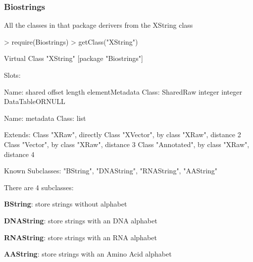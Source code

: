 \documentclass{beamer}
\begin{document}
\begin{frame}[fragile]
\frametitle{Biostrings}
  \bit
      \item \small{All the classes in that package derivers from the XString class}
        \begin{uncoverenv}
\begin{Schunk}
\begin{Sinput}
> require(Biostrings)
> getClass("XString")
\end{Sinput}
\begin{Soutput}
Virtual Class "XString" [package "Biostrings"]

Slots:
                                                                      
Name:           shared          offset          length elementMetadata
Class:       SharedRaw         integer         integer DataTableORNULL
                      
Name:         metadata
Class:            list

Extends: 
Class "XRaw", directly
Class "XVector", by class "XRaw", distance 2
Class "Vector", by class "XRaw", distance 3
Class "Annotated", by class "XRaw", distance 4

Known Subclasses: "BString", "DNAString", "RNAString", "AAString"
\end{Soutput}
\end{Schunk}
        \end{uncoverenv}
      \item There are 4 subclasses:
        \bit
            \item \small{\textbf{BString}: store strings without alphabet}
            \item \small{\textbf{DNAString}: store strings with an DNA alphabet}
            \item \small{\textbf{RNAString}: store strings with an RNA alphabet}
            \item \small{\textbf{AAString}: store strings with an Amino Acid alphabet}
        \eit
  \eit
\end{frame}

\end{document}
